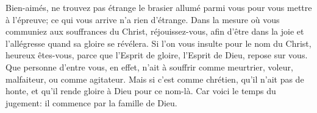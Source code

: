 Bien-aimés, ne trouvez pas étrange le brasier allumé parmi vous
		pour vous mettre à l’épreuve;
	ce qui vous arrive n’a rien d’étrange.
Dans la mesure où vous communiez aux souffrances du Christ,
	réjouissez-vous, afin d’être dans la joie et l’allégresse
	quand sa gloire se révélera.
Si l’on vous insulte pour le nom du Christ, heureux êtes-vous,
	parce que l’Esprit de gloire, l’Esprit de Dieu, repose sur vous.
Que personne d’entre vous, en effet,
	n’ait à souffrir comme meurtrier, voleur, malfaiteur, ou comme agitateur.
Mais si c’est comme chrétien, qu’il n’ait pas de honte,
	et qu’il rende gloire à Dieu pour ce nom-là.
Car voici le temps du jugement:
	il commence par la famille de Dieu.
